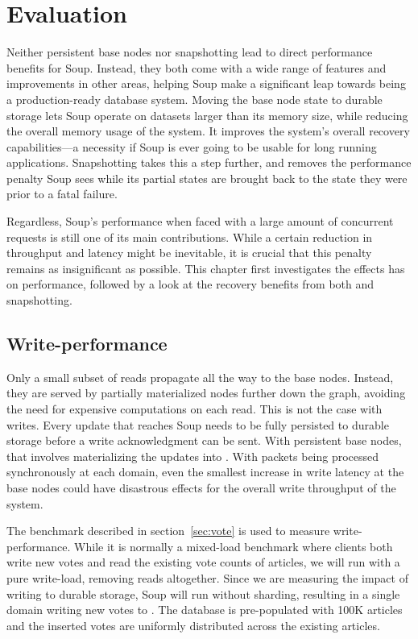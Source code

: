 \chapter{Evaluation}\label{chap:evaluation}

Neither persistent base nodes nor snapshotting lead to direct performance
benefits for Soup. Instead, they both come with a wide range of features and
improvements in other areas, helping Soup make a significant leap towards being
a production-ready database system. Moving the base node state to durable
storage lets Soup operate on datasets larger than its memory size, while
reducing the overall memory usage of the system. It improves the system's
overall recovery capabilities---a necessity if Soup is ever going to be usable
for long running applications. Snapshotting takes this a step further, and
removes the performance penalty Soup sees while its partial states are brought
back to the state they were prior to a fatal failure.

Regardless, Soup's performance when faced with a large amount of concurrent
requests is still one of its main contributions. While a certain reduction in
throughput and latency might be inevitable, it is crucial that this penalty
remains as insignificant as possible. This chapter first investigates the
effects  has on performance, followed by a look at the
recovery benefits from both  and snapshotting.

\section{Write-performance}

Only a small subset of reads propagate all the way to the base nodes. Instead,
they are served by partially materialized nodes further down the graph, avoiding
the need for expensive computations on each read. This is not the case with
writes. Every update that reaches Soup needs to be fully persisted to durable
storage before a write acknowledgment can be sent. With persistent base nodes,
that involves materializing the updates into . With
packets being processed synchronously at each domain, even the smallest increase
in write latency at the base nodes could have disastrous effects for the overall
write throughput of the system.

The  benchmark described in section~\ref{sec:vote} is used to measure
write-performance. While it is normally a mixed-load benchmark where clients
both write new votes and read the existing vote counts of articles, we will run
 with a pure write-load, removing reads altogether. Since we are
measuring the impact of writing to durable storage, Soup will run without
sharding, resulting in a single domain writing new votes to
. The database is pre-populated with 100K articles and the
inserted votes are uniformly distributed across the existing articles.

